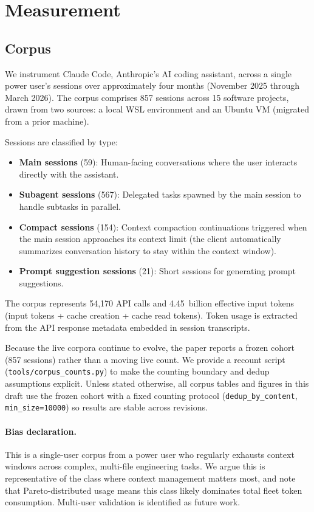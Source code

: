 \section{Measurement}
\label{sec:methodology}

\subsection{Corpus}
\label{sec:corpus}

We instrument Claude Code, Anthropic's AI coding assistant, across
a single power user's sessions over approximately four months
(November 2025 through March 2026). The corpus comprises 857
sessions across 15 software projects, drawn from two sources:
a local WSL environment and an Ubuntu VM (migrated from a prior
machine).

Sessions are classified by type:
\begin{itemize}[nosep]
  \item \textbf{Main sessions} (59): Human-facing conversations
    where the user interacts directly with the assistant.
  \item \textbf{Subagent sessions} (567): Delegated tasks spawned
    by the main session to handle subtasks in parallel.
  \item \textbf{Compact sessions} (154): Context compaction
    continuations triggered when the main session approaches
    its context limit (the client automatically summarizes
    conversation history to stay within the context window).
  \item \textbf{Prompt suggestion sessions} (21): Short sessions
    for generating prompt suggestions.
\end{itemize}

The corpus represents 54{,}170 API calls and 4.45~billion effective
input tokens (input tokens + cache creation + cache read tokens).
Token usage is extracted from the API response metadata embedded in
session transcripts.

Because the live corpora continue to evolve, the paper reports a
frozen cohort (857 sessions) rather than a moving live count. We
provide a recount script (\texttt{tools/corpus\_counts.py}) to make
the counting boundary and dedup assumptions explicit.
Unless stated otherwise, all corpus tables and figures in this draft
use the frozen cohort with a fixed counting protocol
(\texttt{dedup\_by\_content}, \texttt{min\_size=10000}) so results are
stable across revisions.

\paragraph{Bias declaration.}
This is a single-user corpus from a power user who regularly
exhausts context windows across complex, multi-file engineering
tasks. We argue this is representative of the class where context
management matters most, and note that Pareto-distributed usage
means this class likely dominates total fleet token consumption.
Multi-user validation is identified as future work.

